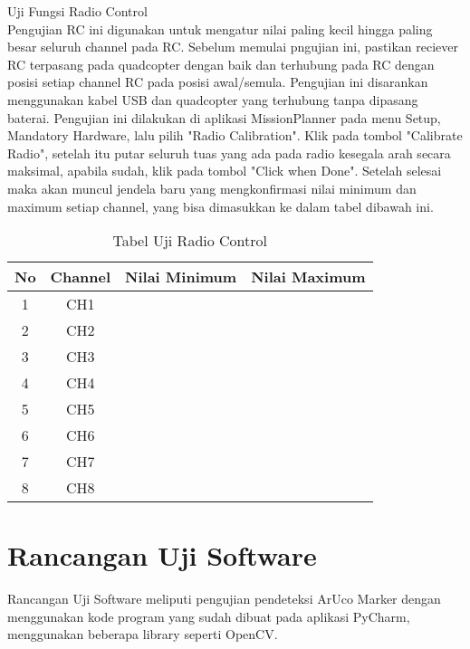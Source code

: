 \begin{packed_item}
\begin{packed_item}
		\item [d.]  Uji Fungsi Radio Control
		\\ Pengujian RC ini digunakan untuk mengatur nilai paling kecil hingga paling besar seluruh channel pada RC. Sebelum memulai pngujian ini, pastikan reciever RC terpasang pada quadcopter dengan baik dan terhubung pada RC dengan posisi setiap channel RC pada posisi awal/semula. Pengujian ini disarankan menggunakan kabel  USB dan quadcopter yang terhubung tanpa dipasang baterai.
		Pengujian ini dilakukan di aplikasi MissionPlanner pada menu Setup, Mandatory Hardware, lalu pilih "Radio Calibration". Klik pada tombol "Calibrate Radio", setelah itu putar seluruh tuas yang ada pada radio kesegala arah secara maksimal, apabila sudah, klik pada tombol "Click when Done". Setelah selesai maka akan muncul jendela baru yang mengkonfirmasi nilai minimum dan maximum setiap channel, yang bisa dimasukkan ke dalam tabel dibawah ini.
		\begin{table}[h]
			\label{tab:radio}
			\centering
			\begin{tabular}{|c|c|c|c|}
				\hline
				No & Channel   & Nilai Minimum & Nilai Maximum \\ \hline
				1  & CH1     & &            \\ \hline
				2  & CH2     & &           \\ \hline
				3  & CH3     & &           \\ \hline
				4  & CH4     & &           \\ \hline
				5  & CH5 	 & &           \\ \hline
				6  & CH6     & &           \\ \hline
				7  & CH7     & &           \\ \hline
				8  & CH8     & &           \\ \hline
			\end{tabular}
			\caption{Tabel Uji Radio Control}
		\end{table}
	\end{packed_item}
\end{packed_item}

\section{Rancangan Uji Software}
Rancangan Uji Software meliputi pengujian pendeteksi ArUco Marker dengan menggunakan kode program yang sudah dibuat pada aplikasi PyCharm, menggunakan beberapa library seperti OpenCV.

